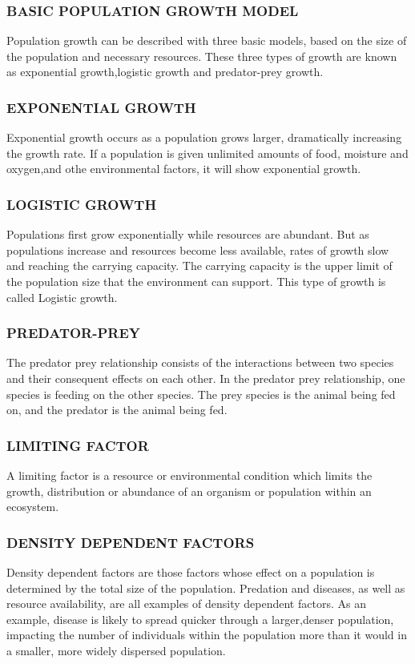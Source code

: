 \documentclass[a4paper,12pt]{report}
\numberwithin{equation}{section}
\begin{document}
\subsubsection{BASIC POPULATION GROWTH MODEL}
\indent Population growth can be described with three basic models, based on the size of the population and necessary resources. These three types of growth are known as exponential growth,logistic growth and predator-prey growth.


\subsubsection{EXPONENTIAL GROWTH}
\indent Exponential growth occurs as a population grows larger, dramatically increasing the growth rate. If a population is given unlimited amounts of food, moisture and oxygen,and othe environmental factors, it will show exponential growth.


\subsubsection{LOGISTIC GROWTH}
\indent Populations first grow exponentially while resources are abundant. But as populations increase and resources become less available, rates of growth slow and reaching the carrying capacity. The carrying capacity is the upper limit of the population size that the environment can support. This type of growth is called Logistic growth.

\subsubsection{PREDATOR-PREY}
The predator prey relationship consists of the interactions between two species and their consequent effects on each other. In the predator prey relationship, one species is feeding on the other species. The prey species is the animal being fed on, and the predator is the animal being fed.
 

\subsubsection{LIMITING FACTOR}
\indent A limiting factor is a resource or environmental condition which limits the growth, distribution or abundance of an organism or population within an ecosystem.

\subsubsection{DENSITY DEPENDENT FACTORS}
\indent Density dependent factors are those factors whose effect on a population is determined by the total size of the population. Predation and diseases, as well as resource availability, are all examples of density dependent factors. As an example, disease is likely to spread quicker through a larger,denser population, impacting the number of individuals within the population more than it would in a smaller, more widely dispersed population.
\end{document}
